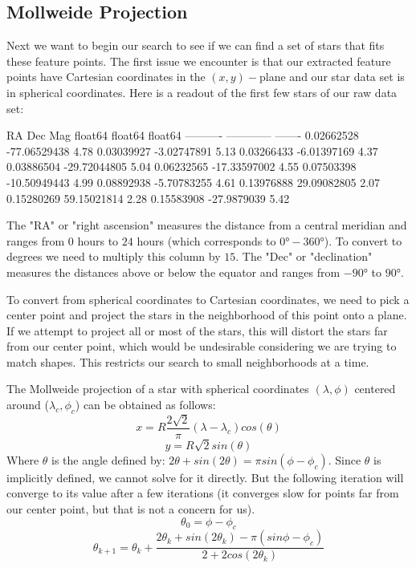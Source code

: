 \documentclass[paper=a4, fontsize=11pt]{scrartcl} %
\begin{document}
\subsection{Mollweide Projection}
Next we want to begin our search to see if we can find a set of stars that fits these feature points. The first issue we encounter is that our extracted feature points have Cartesian coordinates in the $(x,y)-$plane and our star data set is in spherical coordinates. Here is a readout of the first few stars of our raw data set:
\begin{python}
	   RA         Dec        Mag  
	float64     float64    float64
	---------- ------------ -------
	0.02662528 -77.06529438    4.78
	0.03039927  -3.02747891    5.13
	0.03266433  -6.01397169    4.37
	0.03886504 -29.72044805    5.04
	0.06232565 -17.33597002    4.55
	0.07503398 -10.50949443    4.99
	0.08892938  -5.70783255    4.61
	0.13976888  29.09082805    2.07
	0.15280269  59.15021814    2.28
	0.15583908  -27.9879039    5.42
\end{python}
The "RA" or "right ascension" measures the distance from a central meridian and ranges from $0$ hours to $24$ hours (which corresponds to $0\si{\degree}-360\si{\degree}$). To convert to degrees we need to multiply this column by $15$.
The "Dec" or "declination" measures the distances above or below the equator and ranges from $-90\si{\degree}$ to $90\si{\degree}$.

To convert from spherical coordinates to Cartesian coordinates, we need to pick a center point and project the stars in the neighborhood of this point onto a plane.  If we attempt to project all or most of the stars, this will distort the stars far from our center point, which would be undesirable considering we are trying to match shapes.  This restricts our search to small neighborhoods at a time.

The Mollweide projection of a star with spherical coordinates $(\lambda,\phi)$ centered around ($\lambda_c,\phi_c$) can be obtained as follows:
$$
x = R\frac{2\sqrt{2}}{\pi}(\lambda-\lambda_c)cos(\theta)$$$$
y = R\sqrt{2}sin(\theta)
$$
Where $\theta$ is the angle defined by: $2\theta + sin(2\theta)=\pi sin(\phi-\phi_c)$.  Since $\theta$ is implicitly defined, we cannot solve for it directly. But the following iteration will converge to its value after a few iterations (it converges slow for points far from our center point, but that is not a concern for us).
$$
\theta_0 = \phi-\phi_c
$$$$
\theta_{k+1} = \theta_k + \frac{2\theta_k+sin(2\theta_k)-\pi(sin\phi-\phi_c)}{2+2cos(2\theta_k)}
$$
\end{document}
